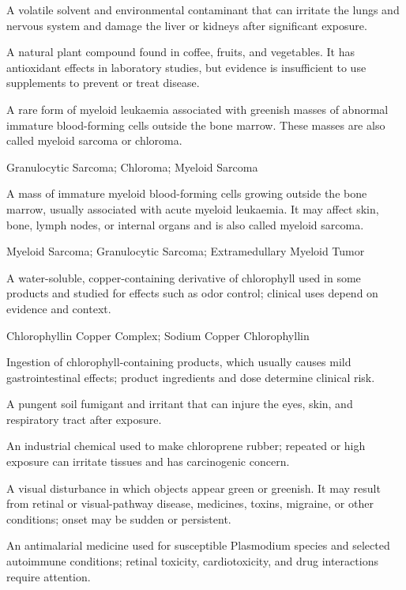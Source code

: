  A volatile solvent and environmental contaminant that can irritate the lungs and nervous system and damage the liver or kidneys after significant exposure.

 A natural plant compound found in coffee, fruits, and vegetables. It has antioxidant effects in laboratory studies, but evidence is insufficient to use supplements to prevent or treat disease.

 A rare form of myeloid leukaemia associated with greenish masses of abnormal immature blood-forming cells outside the bone marrow. These masses are also called myeloid sarcoma or chloroma.

\synonyms
Granulocytic Sarcoma; Chloroma; Myeloid Sarcoma

 A mass of immature myeloid blood-forming cells growing outside the bone marrow, usually associated with acute myeloid leukaemia. It may affect skin, bone, lymph nodes, or internal organs and is also called myeloid sarcoma.

\synonyms
Myeloid Sarcoma; Granulocytic Sarcoma; Extramedullary Myeloid Tumor

 A water-soluble, copper-containing derivative of chlorophyll used in some products and studied for effects such as odor control; clinical uses depend on evidence and context.

\synonyms
Chlorophyllin Copper Complex; Sodium Copper Chlorophyllin

 Ingestion of chlorophyll-containing products, which usually causes mild gastrointestinal effects; product ingredients and dose determine clinical risk.

 A pungent soil fumigant and irritant that can injure the eyes, skin, and respiratory tract after exposure.

 An industrial chemical used to make chloroprene rubber; repeated or high exposure can irritate tissues and has carcinogenic concern.

 A visual disturbance in which objects appear green or greenish. It may result from retinal or visual-pathway disease, medicines, toxins, migraine, or other conditions; onset may be sudden or persistent.

 An antimalarial medicine used for susceptible Plasmodium species and selected autoimmune conditions; retinal toxicity, cardiotoxicity, and drug interactions require attention.

